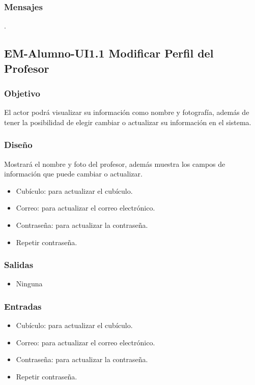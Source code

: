 \subsubsection{Mensajes}
	\noindent
	.

\subsection{EM-Alumno-UI1.1 Modificar Perfil del Profesor}

\subsubsection{Objetivo}
	\noindent
	El actor podrá visualizar su información como nombre y fotografía, además de tener la posibilidad de elegir cambiar o actualizar su información en el sistema. 

\subsubsection{Diseño}
	\noindent
	Mostrará el nombre y foto del profesor, además muestra los campos de información que puede cambiar o actualizar.
	\begin{itemize} 
	\item Cubículo: para actualizar el cubículo.
		\item Correo: para actualizar el correo electrónico.
		\item Contraseña: para actualizar la contraseña.
		\item Repetir contraseña.
	\end{itemize} 



\subsubsection{Salidas}
	\begin{itemize} 
		\item Ninguna
	\end{itemize}

\subsubsection{Entradas}
\begin{itemize} 
	\item Cubículo: para actualizar el cubículo.
		\item Correo: para actualizar el correo electrónico.
		\item Contraseña: para actualizar la contraseña.
		\item Repetir contraseña.
	\end{itemize} 

